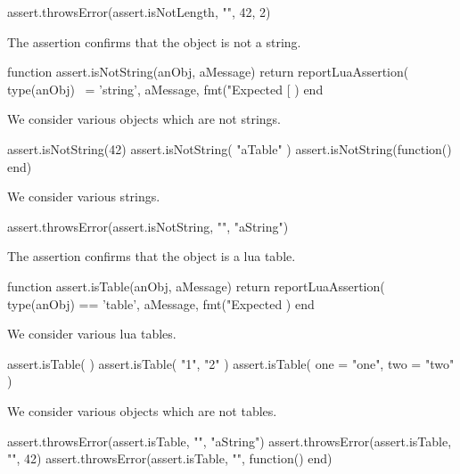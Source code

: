 \startLuaTest
  assert.throwsError(assert.isNotLength, "", 42, 2)
\stopLuaTest
\stopTestCase

\stopTestSuite


The  assertion confirms that the object is not a 
string. 

\startLuaCode
function assert.isNotString(anObj, aMessage)
  return reportLuaAssertion(
    type(anObj) ~= 'string',
    aMessage,
    fmt("Expected [%
  )
end
\stopLuaCode


We consider various objects which are not strings.

\startLuaTest
  assert.isNotString(42)
  assert.isNotString({ "aTable" })
  assert.isNotString(function() end)
\stopLuaTest
\stopTestCase


We consider various strings.

\startLuaTest
  assert.throwsError(assert.isNotString, "", "aString")
\stopLuaTest
\stopTestCase

\stopTestSuite


The  assertion confirms that the object is a lua 
table. 

\startLuaCode
function assert.isTable(anObj, aMessage)
  return reportLuaAssertion(
    type(anObj) == 'table',
    aMessage,
    fmt("Expected %
  )
end
\stopLuaCode


We consider various lua tables.

\startLuaTest
  assert.isTable({ })
  assert.isTable({ "1", "2" })
  assert.isTable({ one = "one", two = "two" })
\stopLuaTest
\stopTestCase


We consider various objects which are not tables. 

\startLuaTest
  assert.throwsError(assert.isTable, "", "aString")
  assert.throwsError(assert.isTable, "", 42)
  assert.throwsError(assert.isTable, "", function() end)
\stopLuaTest
\stopTestCase

\stopTestSuite

